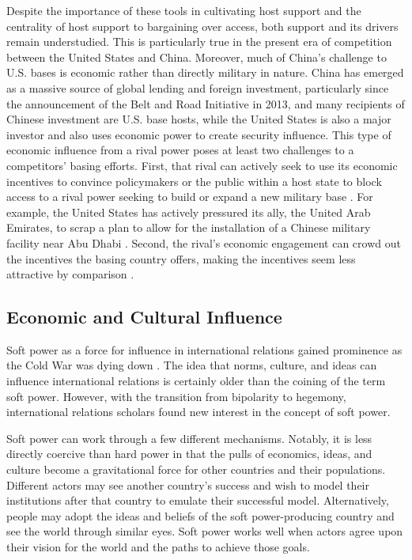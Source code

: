Despite the importance of these tools in cultivating host support and the centrality of host support to bargaining over access, both support and its drivers remain understudied. This is particularly true in the present era of competition between the United States and China. Moreover, much of China's challenge to U.S. bases is economic rather than directly military in nature. China has emerged as a massive source of global lending and foreign investment, particularly since the announcement of the Belt and Road Initiative in 2013, and many recipients of Chinese investment are U.S. base hosts, while the United States is also a major investor and also uses economic power to create security influence. This type of economic influence from a rival power poses at least two challenges to a competitors' basing efforts. First, that rival can actively seek to use its economic incentives to convince policymakers or the public within a host state to block access to a rival power seeking to build or expand a new military base \cite{joyce2023}. For example, the United States has actively pressured its ally, the United Arab Emirates, to scrap a plan to allow for the installation of a Chinese military facility near Abu Dhabi \cite{hudson2023}. Second, the rival's economic engagement can crowd out the incentives the basing country offers, making the incentives seem less attractive by comparison \cite{joyce2023}.

\subsection*{Economic and Cultural Influence}

Soft power as a force for influence in international relations gained prominence as the Cold War was dying down \cite{nye1990}. The idea that norms, culture, and ideas can influence international relations is certainly older than the coining of the term soft power. However, with the transition from bipolarity to hegemony, international relations scholars found new interest in the concept of soft power. 

Soft power can work through a few different mechanisms. Notably, it is less directly coercive than hard power in that the pulls of economics, ideas, and culture become a gravitational force for other countries and their populations. Different actors may see another country's success and wish to model their institutions after that country to emulate their successful model. Alternatively, people may adopt the ideas and beliefs of the soft power-producing country and see the world through similar eyes. Soft power works well when actors agree upon their vision for the world and the paths to achieve those goals.

